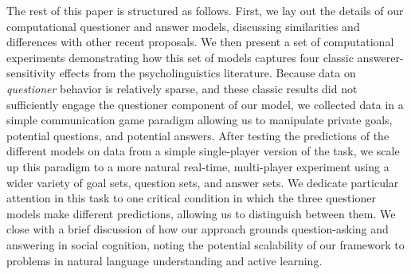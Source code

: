 \documentclass[12pt, floatsintext, jou]{apa6}
\begin{document}
The rest of this paper is structured as follows. First, we lay out the details of our computational questioner and answer models, discussing similarities and differences with other recent proposals.
We then present a set of computational experiments demonstrating how this set of models captures four classic answerer-sensitivity effects from the psycholinguistics literature. Because data on \emph{questioner} behavior is relatively sparse, and these classic results did not sufficiently engage the questioner component of our model, we collected data in a simple communication game paradigm allowing us to manipulate private goals, potential questions, and potential answers. After testing the predictions of the different models on data from a simple single-player version of the task, we scale up this paradigm to a more natural real-time, multi-player experiment using a wider variety of goal sets, question sets, and answer sets. We dedicate particular attention in this task to one critical condition in which the three questioner models make different predictions, allowing us to distinguish between them.
We close with a brief discussion of how our approach grounds question-asking and answering in social cognition, noting the potential scalability of our framework to problems in natural language understanding and active learning.
\end{document}
